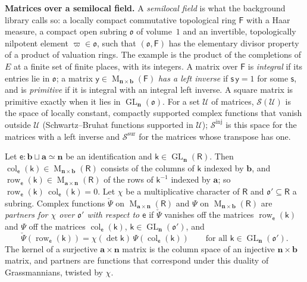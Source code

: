 \documentclass[11pt,a4paper]{article}
\newcommand{\kw}[1]{\emph{#1}}
\newcommand{\subhead}[1]{\par\addvspace{9pt plus 2pt}\Needspace{4\baselineskip}\noindent\textbf{#1}\enspace\ignorespaces}
\theoremstyle{plainx}
\theoremstyle{uprightx}
\newcommand{\dL}{\check{\Psi}}         %
\newcommand{\dS}{\Psi}                 %
\newcommand{\sF}{\mathsf{F}}
\newcommand{\sO}{\mathfrak{o}}
\newcommand{\sR}{\mathsf{R}}
\newcommand{\ba}{\mathbf{a}}
\newcommand{\bb}{\mathbf{b}}
\newcommand{\bn}{\mathbf{n}}
\newcommand{\se}{\mathsf{e}}
\newcommand{\sk}{\mathsf{k}}
\newcommand{\sy}{\mathsf{y}}
\newcommand{\ssx}{\mathsf{s}}
\newcommand{\GL}{\operatorname{GL}}
\newcommand{\cS}{\mathcal{S}}
\newcommand{\Mat}[2]{\operatorname{M}_{#1\times#2}}
\newcommand{\rowk}[2]{\operatorname{row}_{#1}(#2)}
\newcommand{\colk}[2]{\operatorname{col}_{#1}(#2)}
\begin{document}
\subhead{Matrices over a semilocal field.} A \kw{semilocal field} is what the background library calls so: a
locally compact commutative topological ring $\sF$ with a Haar measure, a compact open subring $\sO$ of
volume~$1$ and an invertible, topologically nilpotent element $\varpi\in\sO$, such that $(\sO,\sF)$ has the
elementary divisor property of a product of valuation rings. The example is the product of the completions of $E$
at a finite set of finite places, with its integers. A matrix over $\sF$ is \kw{integral} if its entries lie in
$\sO$; a matrix $\sy\in\Mat{\bn}{\bb}(\sF)$ \kw{has a left inverse} if $\ssx\,\sy=1$ for some $\ssx$, and is
\kw{primitive} if it is integral with an integral left inverse. A square matrix is primitive exactly when it lies
in $\GL_{\bn}(\sO)$. For a set $\mathcal{U}$ of matrices, $\cS(\mathcal{U})$ is the space of locally constant,
compactly supported complex functions that vanish outside $\mathcal{U}$ (Schwartz--Bruhat functions supported in
$\mathcal{U}$); $\cS^{\mathrm{inj}}$ is this space for the matrices with a left inverse and $\cS^{\mathrm{sur}}$
for the matrices whose transpose has one.

Let $\se\colon\bb\sqcup\ba\simeq\bn$ be an identification and $\sk\in\GL_{\bn}(\sR)$. Then
$\colk{\se}{\sk}\in\Mat{\bn}{\bb}(\sR)$ consists of the columns of $\sk$ indexed by $\bb$, and
$\rowk{\se}{\sk}\in\Mat{\ba}{\bn}(\sR)$ of the rows of $\sk^{-1}$ indexed by $\ba$; so
$\rowk{\se}{\sk}\,\colk{\se}{\sk}=0$. Let $\chi$ be a multiplicative character of $\sR$ and $\sO'\subseteq\sR$ a
subring. Complex functions $\dL$ on $\Mat{\ba}{\bn}(\sR)$ and $\dS$ on $\Mat{\bn}{\bb}(\sR)$ are \kw{partners for
$\chi$ over $\sO'$ with respect to $\se$} if $\dL$ vanishes off the matrices $\rowk{\se}{\sk}$ and $\dS$ off the
matrices $\colk{\se}{\sk}$, $\sk\in\GL_{\bn}(\sO')$, and
\[\dL(\rowk{\se}{\sk})=\chi(\det\sk)\,\dS(\colk{\se}{\sk})\qquad\text{for all }\sk\in\GL_{\bn}(\sO').\]
The kernel of a surjective $\ba\times\bn$ matrix is the column space of an injective $\bn\times\bb$ matrix, and
partners are functions that correspond under this duality of Grassmannians, twisted by $\chi$.
\end{document}

